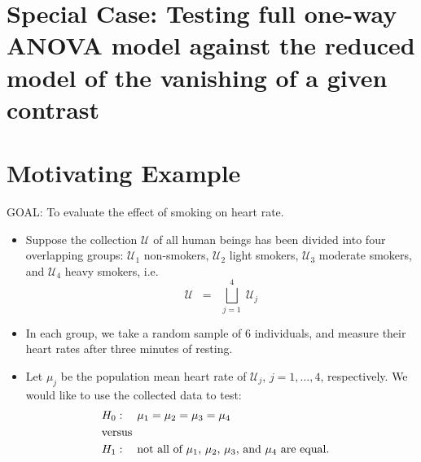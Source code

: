 \documentclass{article}
\begin{document}

\section{Special Case: Testing full one-way ANOVA model against the reduced model of the vanishing of a given contrast}
\setcounter{theorem}{0}


\section{Motivating Example}
\setcounter{theorem}{0}

\noindent
GOAL: To evaluate the effect of smoking on heart rate.

\begin{itemize}
\item  Suppose the collection $\mathcal{U}$ of all human beings has been divided into four overlapping groups: $\mathcal{U}_{1}$ non-smokers, $\mathcal{U}_{2}$ light smokers, $\mathcal{U}_{3}$ moderate smokers, and $\mathcal{U}_{4}$ heavy smokers, i.e.
\begin{equation*}
\mathcal{U} \;\; = \;\; \bigsqcup_{j=1}^{4} \; \mathcal{U}_{j}
\end{equation*}
\item  In each group, we take a random sample of $6$ individuals, and measure their heart rates after three minutes of resting.
\item  Let $\mu_{j}$ be the population mean heart rate of $\mathcal{U}_{j}$, $j = 1, \ldots, 4$, respectively.  We would like to use the collected data to test:
\begin{eqnarray*}
&H_{0}: \quad \mu_{1} = \mu_{2} = \mu_{3} = \mu_{4} &\\
&\textnormal{versus}& \\
&H_{1}: \quad \textnormal{not all of $\mu_{1}$, $\mu_{2}$, $\mu_{3}$, and $\mu_{4}$ are equal.}&\\
\end{eqnarray*}
\end{itemize}

\end{document}

